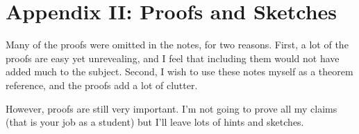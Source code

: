 \documentclass{article}
\numberwithin{equation}{section}
\theoremstyle{definition}
\begin{document}
\section{Appendix II: Proofs and Sketches}
Many of the proofs were omitted in the notes, for two reasons. First, a lot of the proofs are easy yet unrevealing, and I feel that including them would not have added much to the subject. Second, I wish to use these notes myself as a theorem reference, and the proofs add a lot of clutter.

However, proofs are still very important. I'm not going to prove all my claims (that is your job as a student) but I'll leave lots of hints and sketches.
\end{document}

